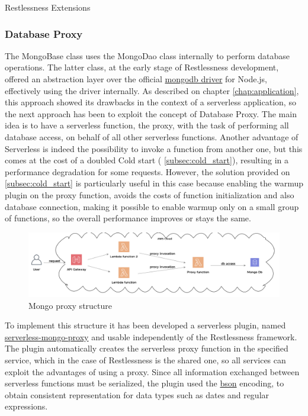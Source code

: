 \begin{chapter}{Restlessness Extensions}
    \subsubsection{Database Proxy}
    \label{subsec:database_proxy}
    The MongoBase class uses the MongoDao class internally to perform database
    operations. The latter class, at the early stage of Restlessness development,
    offered an abstraction layer over the official
    \href{https://www.npmjs.com/package/mongodb}{mongodb driver} for Node.js,
    effectively using the driver internally.
    As described on chapter \ref{chap:application}, this approach showed its
    drawbacks in the context of a serverless application, so the next approach has
    been to exploit the concept of Database Proxy.
    The main idea is to have a serverless function, the proxy, with the task of
    performing all database access, on behalf of all other serverless functions.
    Another advantage of Serverless is indeed the possibility to invoke a function
    from another one, but this comes at the cost of a doubled Cold start (
    \ref{subsec:cold_start}), resulting in a performance degradation for some requests.
    However, the solution provided on \ref{subsec:cold_start} is particularly useful in
    this case because enabling the warmup plugin on the proxy function, avoids the
    costs of function initialization and also database connection, making it possible
    to enable warmup only on a small group of functions, so the overall performance
    improves or stays the same.

    \begin{figure}
        \centering
        \includegraphics[width=\linewidth]{source/diagrams/mongo_proxy.png}
        \caption{Mongo proxy structure}
    \end{figure}

    To implement this structure it has been developed a serverless plugin, named
    \href{https://www.npmjs.com/package/serverless-mongo-proxy}{serverless-mongo-proxy}
    and usable independently of the Restlessness framework.
    The plugin automatically creates the serverless proxy function in the specified
    service, which in the case of Restlessness is the shared one, so all services
    can exploit the advantages of using a proxy.
    Since all information exchanged between serverless functions must be serialized,
    the plugin used the \href{http://bsonspec.org/}{bson} encoding, to obtain consistent
    representation for data types such as dates and regular expressions.


\end{chapter}
